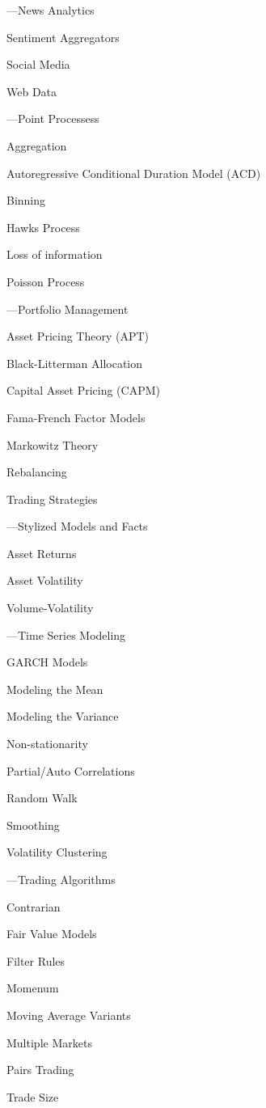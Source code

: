 %
\begin{minipage}{0.40\textwidth}
\noindent ---News Analytics
	\begin{flushright}
	Sentiment Aggregators \par
	Social Media \par
	Web Data 
	\end{flushright}

\noindent ---Point Processess
	\begin{flushright}
	Aggregation \par
	Autoregressive Conditional Duration Model (ACD) \par
	Binning \par
	Hawks Process \par
	Loss of information \par
	Poisson Process
	\end{flushright}

\noindent ---Portfolio Management 
	\begin{flushright}
	Asset Pricing Theory (APT) \par
	Black-Litterman Allocation \par 
	Capital Asset Pricing (CAPM) \par
	Fama-French Factor Models \par
	Markowitz Theory \par
	Rebalancing \par
	Trading Strategies 
	\end{flushright}


\noindent ---Stylized Models and Facts
	\begin{flushright}
	Asset Returns \par
	Asset Volatility \par
	Volume-Volatility 
	\end{flushright}
	

\noindent ---Time Series Modeling
	\begin{flushright}
	GARCH Models \par
	Modeling the Mean \par
	Modeling the Variance \par
	Non-stationarity \par
	Partial/Auto Correlations \par
	Random Walk \par
	Smoothing \par
	Volatility Clustering 
	\end{flushright}


\noindent ---Trading Algorithms
	\begin{flushright}
	Contrarian \par
	Fair Value Models \par
	Filter Rules \par
	Momenum \par
	Moving Average Variants \par
	Multiple Markets \par
	Pairs Trading \par
	Trade Size 
	\end{flushright}
\end{minipage}











	

